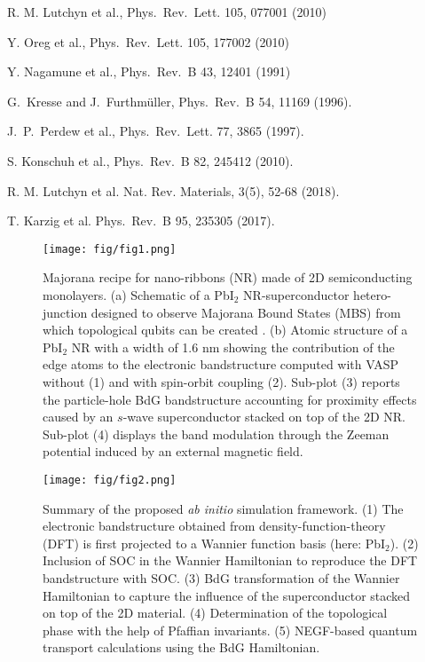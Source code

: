 \documentclass[10pt,usletter,conference]{IEEEtran}
\begin{document}
\begin{thebibliography}{10}
R. M. Lutchyn et al., Phys.~Rev.~Lett. 105, 077001 (2010)

Y. Oreg et al., Phys.~Rev.~Lett. 105, 177002 (2010)

Y. Nagamune et al., Phys.~Rev.~B 43, 12401 (1991)

G.~Kresse and J.~Furthm\"uller, Phys.~Rev.~B 54, 11169 (1996).

J.~P.~Perdew et al., Phys.~Rev.~Lett. 77, 3865 (1997).

S. Konschuh et al., Phys.~Rev.~B 82, 245412 (2010).

R. M. Lutchyn et al. Nat. Rev. Materials, 3(5), 52-68 (2018). 

T. Karzig et al. Phys.~Rev.~B 95, 235305 (2017).


\end{thebibliography}
\newpage

\begin{figure*}
\centering
\texttt{[image: fig/fig1.png]}
\caption{Majorana recipe for nano-ribbons (NR) made of 2D
  semiconducting monolayers. (a) Schematic of a PbI$_2$
  NR-superconductor hetero-junction designed to observe Majorana Bound
  States (MBS) from which topological qubits can be created
  \cite{QubitArch}. (b) Atomic structure of a PbI$_2$ NR with a width of
  1.6 nm showing the contribution of the edge atoms to the electronic
  bandstructure computed with VASP without (1) and with spin-orbit
  coupling (2). Sub-plot (3) reports the particle-hole BdG
  bandstructure accounting for proximity effects caused by an $s$-wave
  superconductor stacked on top of the 2D NR. Sub-plot (4) displays
  the band modulation through the Zeeman potential induced by an
  external magnetic field.} 
\label{fig:1}
\end{figure*}

\begin{figure*}
\centering
\texttt{[image: fig/fig2.png]}
\caption{Summary of the proposed \textit{ab initio} simulation
  framework. (1) The electronic bandstructure obtained from
  density-function-theory (DFT) is first projected to a Wannier
  function basis (here: PbI$_2$). (2) Inclusion of SOC in the Wannier
  Hamiltonian to reproduce the DFT bandstructure with SOC. (3) BdG
  transformation of the Wannier Hamiltonian to capture the influence
  of the superconductor stacked on top of the 2D material. (4)
  Determination of the topological phase with the help of Pfaffian
  invariants. (5) NEGF-based quantum transport calculations using the
  BdG Hamiltonian.}
\label{fig:2}
\end{figure*}
\end{document}
